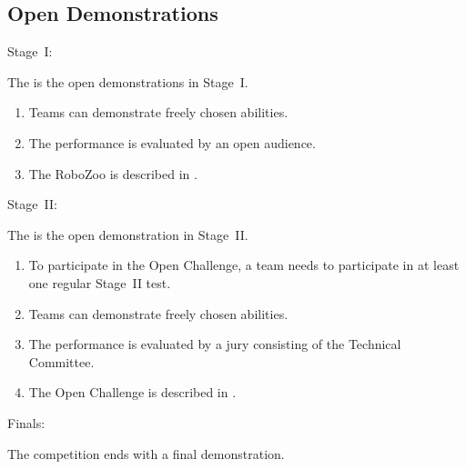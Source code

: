 \subsection{Open Demonstrations} \label{sec:open-demonstrations}
\begin{enumerate}
  {\bf\item Stage~I:} The  is the open demonstrations in Stage~I.
  \begin{enumerate}
    \item Teams can demonstrate freely chosen abilities. 
    \item The performance is evaluated by an open audience.
    \item The RoboZoo is described in .
  \end{enumerate}
  {\bf\item Stage~II:} The  is the open demonstration in Stage~II.
  \begin{enumerate}
    \item To participate in the Open Challenge, a team needs to participate in at least one regular Stage~II test.
    \item Teams can demonstrate freely chosen abilities. 
    \item The performance is evaluated by a jury consisting of the Technical Committee.
    \item The Open Challenge is described in .
  \end{enumerate}
  {\bf\item Finals:} The competition ends with a final demonstration.

\end{enumerate}
